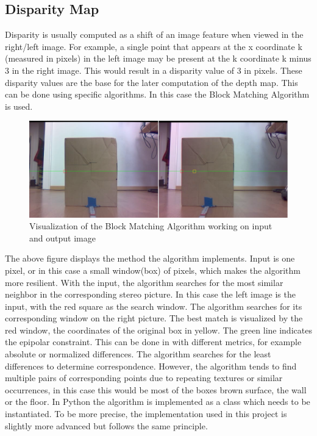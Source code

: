 \documentclass[journal,onecolumn]{IEEEtran}
\begin{document}
\subsection{Disparity Map}
\noindent
Disparity is usually computed as a shift of an image feature when viewed in the right/left image. For example, a single point that appears at the x coordinate k (measured in pixels) in the left image may be present at the k coordinate k minus 3 in the right image. This would result in a disparity value of 3 in pixels. These disparity values are the base for the later computation of the depth map.
This can be done using specific algorithms. In this case the Block Matching Algorithm is used.
\begin{figure}[H]
	\centering
	\includegraphics[scale=0.65]{bma.png}
	\captionsetup{justification=centering}
	\caption{Visualization of the Block Matching Algorithm working on input and output image}
\end{figure}
\noindent
The above figure displays the method the algorithm implements. Input is one pixel, or in this case a small window(box) of pixels, which makes the algorithm more resilient. With the input, the algorithm searches for the most similar neighbor in the corresponding stereo picture. In this case the left image is the input, with the red square as the search window. The algorithm searches for its corresponding window on the right picture. The best match is visualized by the red window, the coordinates of the original box in yellow. The green line indicates the epipolar constraint.
This can be done in with different metrics, for example absolute or normalized differences. The algorithm searches for the least differences to determine correspondence. However, the algorithm tends to find multiple pairs of corresponding points due to repeating textures or similar occurrences, in this case this would be most of the boxes brown surface, the wall or the floor.
In Python the algorithm is implemented as a class which needs to be instantiated. To be more precise, the implementation used in this project is slightly more advanced\cite{SGBM} but follows the same principle.
\end{document}
